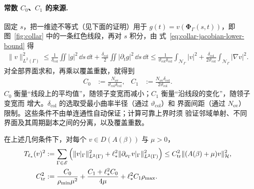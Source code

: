 \begin{workonly}

\paragraph{常数 $C_0$、$C_1$ 的来源.}
固定 $s$，把一维迹不等式（见下面的证明）用于 $g(t)=v(\boldsymbol\Phi_\Gamma(s,t))$，即
图~\ref{fig:collar} 中的一条红色线段，再对 $s$ 积分，由
式~\eqref{eq:collar-jacobian-lower-bound} 得
\begin{align*}
  \lVert v\rVert_{L^2(\Gamma)}^2
  \leq\frac1{\delta_{\mathrm{col}}}\iint|g|^2\,\dd s\,\dd t
    +\frac{\delta_{\mathrm{col}}}2\iint|\partial_tg|^2\,\dd s\,\dd t
  \leq\frac{1}{\vartheta_{\mathrm{col}}\delta_{\mathrm{col}}}
    \int_{\mathcal N_\Gamma}|v|^2
    +\frac{\delta_{\mathrm{col}}}{2\vartheta_{\mathrm{col}}}
    \int_{\mathcal N_\Gamma}|\nabla v|^2.
\end{align*}
对全部界面求和，再乘以覆盖重数，就得到
\begin{align}
  C_0&:=\frac{N_{\mathrm{ov}}}{\vartheta_{\mathrm{col}}\delta_{\mathrm{col}}},
  &C_1&:=\frac{N_{\mathrm{ov}}\delta_{\mathrm{col}}}{2\vartheta_{\mathrm{col}}}.
  \label{eq:trace-geometry-constants}
\end{align}
$C_0$ 衡量“线段上的平均值”，随领子变宽而减小；$C_1$ 衡量“沿线段的变化”，随领子变宽而
增大。$\delta_{\mathrm{col}}$ 的选取受最小曲率半径（通过 $\vartheta_{\mathrm{col}}$）和
界面间距（通过 $N_{\mathrm{ov}}$）限制。这些条件不由单连通性自动保证；计算可靠上界时须
验证邻域单射、不同界面及其周期副本之间的分离，以及覆盖重数。

\begin{proposition}[全界面正移位迹估计]
  \label{prop:positive-shift-trace-bound}
  在上述几何条件下，对每个 $v\in D(A(\beta))$ 与 $\mu>0$，
  \begin{align}
    T_{\ell_*}(v)^2
    &:=\sum_{\Gamma\in\mathscr E}
    \left(
      \lVert v|_\Gamma\rVert_{L^2(\Gamma)}^2
      +\ell_*^2\lVert\partial_{\nu_\Gamma}v|_\Gamma\rVert_{L^2(\Gamma)}^2
    \right)
    \leq C_{\mathrm{tr}}^2\lVert(A(\beta)+\mu)v\rVert_{\mathcal H}^2,
    \label{eq:positive-shift-trace-bound}\\
    C_{\mathrm{tr}}^2
    &:=\frac{C_0}{\rho_{\min}\mu^2}+\frac{C_1+\ell_*^2C_0}{4\mu}+\ell_*^2C_1\rho_{\max}.
    \label{eq:trace-constant}
  \end{align}
\end{proposition}


\end{workonly}
